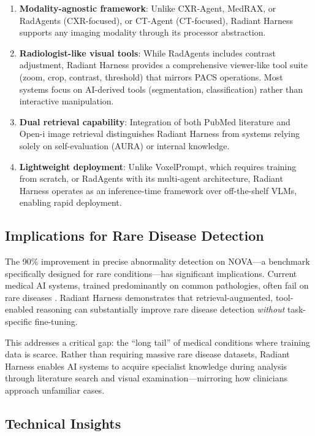 \documentclass[11pt]{article}
\begin{document}
\begin{enumerate}
    \item \textbf{Modality-agnostic framework}: Unlike CXR-Agent, MedRAX, or RadAgents (CXR-focused), or CT-Agent (CT-focused), Radiant Harness supports any imaging modality through its processor abstraction.
    
    \item \textbf{Radiologist-like visual tools}: While RadAgents includes contrast adjustment, Radiant Harness provides a comprehensive viewer-like tool suite (zoom, crop, contrast, threshold) that mirrors PACS operations. Most systems focus on AI-derived tools (segmentation, classification) rather than interactive manipulation.
    
    \item \textbf{Dual retrieval capability}: Integration of both PubMed literature and Open-i image retrieval distinguishes Radiant Harness from systems relying solely on self-evaluation (AURA) or internal knowledge.
    
    \item \textbf{Lightweight deployment}: Unlike VoxelPrompt, which requires training from scratch, or RadAgents with its multi-agent architecture, Radiant Harness operates as an inference-time framework over off-the-shelf VLMs, enabling rapid deployment.
\end{enumerate}

\subsection{Implications for Rare Disease Detection}

The 90\% improvement in precise abnormality detection on NOVA---a benchmark specifically designed for rare conditions---has significant implications. Current medical AI systems, trained predominantly on common pathologies, often fail on rare diseases \citep{bercea2025nova}. Radiant Harness demonstrates that retrieval-augmented, tool-enabled reasoning can substantially improve rare disease detection \textit{without} task-specific fine-tuning.

This addresses a critical gap: the ``long tail'' of medical conditions where training data is scarce. Rather than requiring massive rare disease datasets, Radiant Harness enables AI systems to acquire specialist knowledge during analysis through literature search and visual examination---mirroring how clinicians approach unfamiliar cases.

\subsection{Technical Insights}
\end{document}
